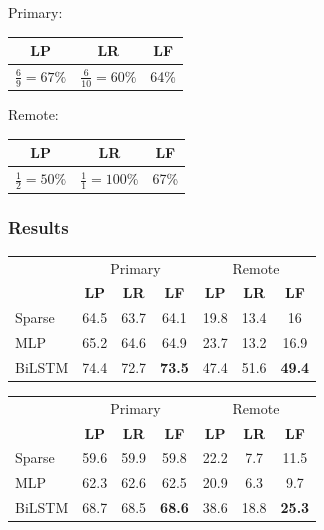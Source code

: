 \documentclass[t]{beamer}
\begin{document}
\begin{frame}
\begin{adjustbox}{frame,scale=.75,center}
\begin{tikzpicture}[level distance=15mm, sibling distance=15mm, ->,
	    every circle node/.append style={fill=black}]
	\end{tikzpicture}
\end{adjustbox}
\vfill
\begin{adjustbox}{scale=.75,center}
	Primary:
	\begin{tabular}{ccc}
		\textbf{LP} & \textbf{LR} & \textbf{LF} \\ \hline
		$\frac69=67\%$ & $\frac6{10}=60\%$ & 64\%
	\end{tabular}
	\hspace{1cm}
	Remote:
	\begin{tabular}{ccc}
		\textbf{LP} & \textbf{LR} & \textbf{LF} \\ \hline
		$\frac12=50\%$ & $\frac11=100\%$ & 67\%
	\end{tabular}
\end{adjustbox}
\end{frame}

\begin{frame}
\frametitle{Results}
\begin{center}
	\begin{tabular}{l|ccc|ccc}
	& \multicolumn{3}{c|}{Primary} & \multicolumn{3}{c}{Remote} \\
	& \textbf{LP} & \textbf{LR} & \textbf{LF} & \textbf{LP} & \textbf{LR} & \textbf{LF} \\
	\hline
	Sparse
	& 64.5 & 63.7 & 64.1 & 19.8 & 13.4 & 16 \\
	MLP
	& 65.2 & 64.6 & 64.9 & 23.7 & 13.2 & 16.9 \\
	BiLSTM
	& 74.4 & 72.7 & \textbf{73.5} & 47.4 & 51.6 & \textbf{49.4}
	\end{tabular}
	
	\vfill
	\pause
	\begin{tabular}{l|ccc|ccc}
	& \multicolumn{3}{c|}{Primary} & \multicolumn{3}{c}{Remote} \\
	& \textbf{LP} & \textbf{LR} & \textbf{LF} & \textbf{LP} & \textbf{LR} & \textbf{LF} \\
	\hline
	Sparse
	& 59.6 & 59.9 & 59.8 & 22.2 & 7.7 & 11.5 \\
	MLP
	& 62.3 & 62.6 & 62.5 & 20.9 & 6.3 & 9.7 \\
	BiLSTM
	& 68.7 & 68.5 & \textbf{68.6} & 38.6 & 18.8 & \textbf{25.3}
	\end{tabular}
\end{center}
\end{frame}
\end{document}
